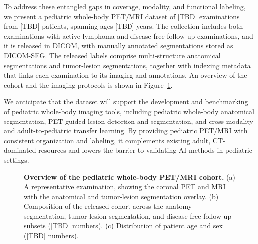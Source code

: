 To address these entangled gaps in coverage, modality, and functional labeling, we present a pediatric whole-body PET/MRI dataset of [TBD] examinations from [TBD] patients, spanning ages [TBD] years.
The collection includes both examinations with active lymphoma and disease-free follow-up examinations, and it is released in DICOM, with manually annotated segmentations stored as DICOM-SEG.
The released labels comprise multi-structure anatomical segmentations and tumor-lesion segmentations, together with indexing metadata that links each examination to its imaging and annotations.
An overview of the cohort and the imaging protocols is shown in Figure~\ref{fig:cohort}.

We anticipate that the dataset will support the development and benchmarking of pediatric whole-body imaging tools, including pediatric whole-body anatomical segmentation, PET-guided lesion detection and segmentation, and cross-modality and adult-to-pediatric transfer learning.
By providing pediatric PET/MRI with consistent organization and labeling, it complements existing adult, CT-dominated resources and lowers the barrier to validating AI methods in pediatric settings.

\begin{figure}[t]
\centering
{}
\caption{\textbf{Overview of the pediatric whole-body PET/MRI cohort.}
(a) A representative examination, showing the coronal PET and MRI with the
anatomical and tumor-lesion segmentation overlay.
(b) Composition of the released cohort across the anatomy-segmentation,
tumor-lesion-segmentation, and disease-free follow-up subsets ([TBD] numbers).
(c) Distribution of patient age and sex ([TBD] numbers).}
\label{fig:cohort}
\end{figure}

